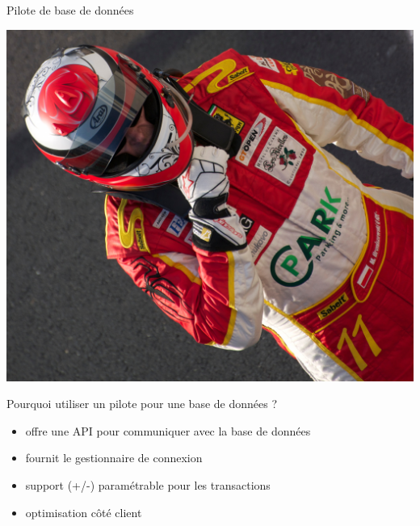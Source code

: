 {  \begin{frame}{Pilote de base de données}
    \begin{center}
      \includegraphics[scale=0.05]{../img/pilot.jpg}
    \end{center}
    \begin{block}{Pourquoi utiliser un pilote pour une base de données ?}
      \begin{itemize}
        \item offre une API pour communiquer avec la base de données
        \item fournit le gestionnaire de connexion
        \item support (+/-) paramétrable pour les transactions
        \item optimisation côté client
      \end{itemize}
    \end{block}
  \end{frame}
}

